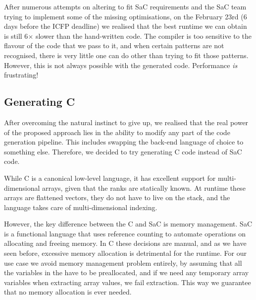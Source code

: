 After numerous attempts on altering  to fit SaC requirements and the SaC
team trying to implement some of the missing optimisations, on the February 23rd
(6 days before the ICFP deadline) we realised that the best runtime we can
obtain is still 6$\times$ slower than the hand-written code.  The compiler is too
sensitive to the flavour of the code that we pass to it, and when certain patterns
are not recognised, there is very little one can do other than trying to fit
those patterns.  However, this is not always possible with the generated code.
Performance \emph{is} frustrating!

\subsection{Generating C}

After overcoming the natural instinct to give up, we realised that the real
power of the proposed approach lies in the ability to modify any part of the
code generation pipeline.  This includes swapping the back-end language of choice
to something else.  Therefore, we decided to try generating C code instead of
SaC code.

While C is a canonical low-level language, it has excellent support for
multi-dimensional arrays, given that the ranks are statically known.
At runtime these arrays are flattened vectors, they do not have to live
on the stack, and the language takes care of multi-dimensional indexing.

However, the key difference between the C and SaC is memory management.
SaC is a functional language that uses reference counting to automate
operations on allocating and freeing memory.  In C these decisions are
manual, and as we have seen before, excessive memory allocation is detrimental
for the runtime.  For our use case we avoid memory management problem
entirely, by assuming that all the variables in the  have
to be preallocated, and if we need any temporary array variables when
extracting array values, we fail extraction.  This way we guarantee
that no memory allocation is ever needed.

